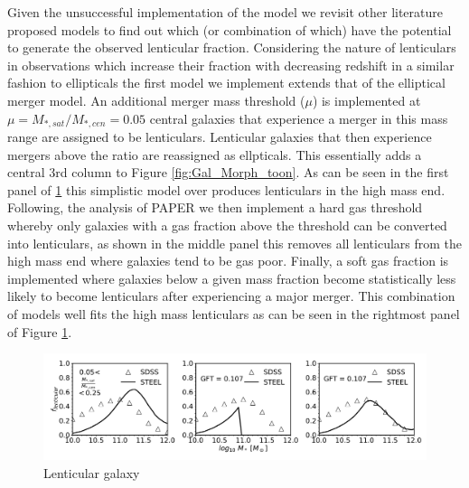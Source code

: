 Given the unsuccessful implementation of the \citet{Cook2009Two-phaseFormation} model we revisit other literature proposed models to find out which (or combination of which) have the potential to generate the observed lenticular fraction. Considering the nature of lenticulars in observations which increase their fraction with decreasing redshift in a similar fashion to ellipticals the first model we implement extends that of the elliptical merger model. An additional merger mass threshold ($\mu$) is implemented at $\mu = M_{*, sat}/M_{*, cen} = 0.05$ central galaxies that experience a merger in this mass range are assigned to be lenticulars. Lenticular galaxies that then experience mergers above the ratio are reassigned as ellpticals. This essentially adds a central 3rd column to Figure \ref{fig:Gal_Morph_toon}. As can be seen in the first panel of \ref{fig:Lentcular_panels} this simplistic model over produces lenticulars in the high mass end. Following, the analysis of PAPER we then implement a hard gas threshold whereby only galaxies with a gas fraction above the threshold can be converted into lenticulars, as shown in the middle panel this removes all lenticulars from the high mass end where galaxies tend to be gas poor. Finally, a soft gas fraction is implemented where galaxies below a given mass fraction become statistically less likely to become lenticulars after experiencing a major merger. This combination of models well fits the high mass lenticulars as can be seen in the rightmost panel of Figure \ref{fig:Lentcular_panels}.

\begin{figure}
  \includegraphics[width=\linewidth]{Figures/Chapter5/Lenticular_three.pdf}
    \caption{Lenticular galaxy}
    \label{fig:Lentcular_panels}
\end{figure}